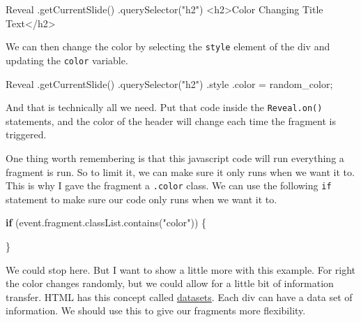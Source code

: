 \documentclass[
  letterpaper,
  DIV=11,
  numbers=noendperiod]{scrreprt}
\newenvironment{Shaded}{\begin{snugshade}}{\end{snugshade}}
\newcommand{\AttributeTok}[1]{\textcolor[rgb]{0.40,0.45,0.13}{#1}}
\newcommand{\BuiltInTok}[1]{\textcolor[rgb]{0.00,0.23,0.31}{#1}}
\newcommand{\ControlFlowTok}[1]{\textcolor[rgb]{0.00,0.23,0.31}{\textbf{#1}}}
\newcommand{\FunctionTok}[1]{\textcolor[rgb]{0.28,0.35,0.67}{#1}}
\newcommand{\NormalTok}[1]{\textcolor[rgb]{0.00,0.23,0.31}{#1}}
\newcommand{\OperatorTok}[1]{\textcolor[rgb]{0.37,0.37,0.37}{#1}}
\newcommand{\StringTok}[1]{\textcolor[rgb]{0.13,0.47,0.30}{#1}}
\begin{document}
\begin{Shaded}
\begin{Highlighting}[]
\NormalTok{Reveal}
  \OperatorTok{.}\FunctionTok{getCurrentSlide}\NormalTok{()}
  \OperatorTok{.}\FunctionTok{querySelector}\NormalTok{(}\StringTok{"h2"}\NormalTok{)}
\OperatorTok{\textless{}}\NormalTok{h2}\OperatorTok{\textgreater{}}\NormalTok{Color Changing Title }\BuiltInTok{Text}\OperatorTok{\textless{}/}\NormalTok{h2}\OperatorTok{\textgreater{}}
\end{Highlighting}
\end{Shaded}

We can then change the color by selecting the \texttt{style} element of
the div and updating the \texttt{color} variable.

\begin{Shaded}
\begin{Highlighting}[]
\NormalTok{Reveal}
  \OperatorTok{.}\FunctionTok{getCurrentSlide}\NormalTok{()}
  \OperatorTok{.}\FunctionTok{querySelector}\NormalTok{(}\StringTok{"h2"}\NormalTok{)}
  \OperatorTok{.}\AttributeTok{style}
  \OperatorTok{.}\AttributeTok{color} \OperatorTok{=}\NormalTok{ random\_color}\OperatorTok{;}
\end{Highlighting}
\end{Shaded}

And that is technically all we need. Put that code inside the
\texttt{Reveal.on()} statements, and the color of the header will change
each time the fragment is triggered.

One thing worth remembering is that this javascript code will run
everything a fragment is run. So to limit it, we can make sure it only
runs when we want it to. This is why I gave the fragment a
\texttt{.color} class. We can use the following \texttt{if} statement to
make sure our code only runs when we want it to.

\begin{Shaded}
\begin{Highlighting}[]
\ControlFlowTok{if}\NormalTok{ (}\BuiltInTok{event}\OperatorTok{.}\AttributeTok{fragment}\OperatorTok{.}\AttributeTok{classList}\OperatorTok{.}\FunctionTok{contains}\NormalTok{(}\StringTok{"color"}\NormalTok{)) \{}

\NormalTok{\}}
\end{Highlighting}
\end{Shaded}

We could stop here. But I want to show a little more with this example.
For right the color changes randomly, but we could allow for a little
bit of information transfer. HTML has this concept called
\href{https://developer.mozilla.org/en-US/docs/Web/API/HTMLElement/dataset}{datasets}.
Each div can have a data set of information. We should use this to give
our fragments more flexibility.
\end{document}
